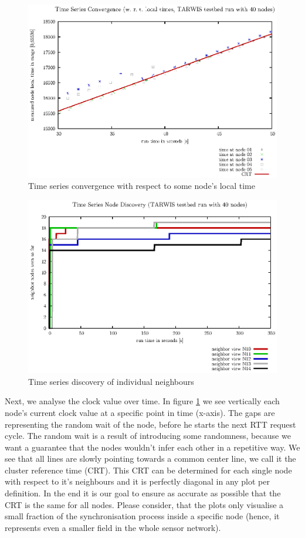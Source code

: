 \documentclass{llncs}
\begin{document}
\begin{figure}[h]
	\centering
	\includegraphics[scale=0.7]{images/FIG_03.eps}
	\caption{Time series convergence with respect to some node's local time}
	\label{fig:local_time}
\end{figure}

\begin{figure}[h]
	\centering
	\includegraphics[scale=0.7]{images/FIG_04.eps}
	\caption{Time series discovery of individual neighbours}
	\label{fig:discovery}
\end{figure}

\noindent Next, we analyse the clock value over time. In figure \ref{fig:local_time} we see vertically each node's current clock value at a specific point in time (x-axis). The gaps are representing the random wait of the node, before he starts the next RTT request cycle. The random wait is a result of introducing some randomness, because we want a guarantee that the nodes wouldn't infer each other in a repetitive way. We see that all lines are slowly pointing towards a common center line, we call it the cluster reference time (CRT). This CRT can be determined for each single node with respect to it's neighbours and it is perfectly diagonal in any plot per definition. In the end it is our goal to ensure as accurate as possible that the CRT is the same for all nodes. Please consider, that the plots only visualise a small fraction of the synchronisation process inside a specific node (hence, it represents even a smaller field in the whole sensor network).\\
\end{document}
